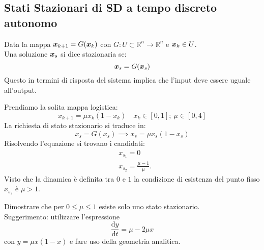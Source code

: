 \subsection{Stati Stazionari di SD a tempo discreto autonomo}%
\label{sub:Stati Stazionari di SD a tempo discreto autonomo}
\begin{defn}
    Data la mappa $\boldsymbol{x}_{k+1}= G(\boldsymbol{x}_k)$ con $G: U \subset \mathbb{R}^n \to \mathbb{R}^n$ e $\boldsymbol{x}_k \in U$.\\
    Una soluzione $\boldsymbol{x}_{s}$ si dice stazionaria se:
    \[
	\boldsymbol{x}_s = G(\boldsymbol{x}_s)
    \] 
    Questo in termini di risposta del sistema implica che l'input deve essere uguale all'output.
\end{defn}
\noindent
\begin{exmp}
    Prendiamo la solita mappa logistica:
    \[
	x_{k+1}= \mu x_k(1-x_k) \quad x_k \in \left[0,1\right]; \ \mu  \in \left[0, 4\right]
    \] 
    La richiesta di stato stazionario si traduce in:
    \[
	x_s = G(x_s) \implies  x_s = \mu x_s(1-x_s)
    \] 
    Risolvendo l'equazione si trovano i candidati:
    \[\begin{aligned}
	&x_{s_1}= 0\\
	& x_{s_2}=\frac{\mu-1}{\mu}
    .\end{aligned}\]
    Visto che la dinamica è definita tra $0$ e $1$ la condizione di esistenza del punto fisso $x_{s_2}$ è $\mu >1$.
\end{exmp}
\noindent
\begin{ex}
    Dimostrare che per $0\le \mu\le 1$ esiste solo uno stato stazionario.\\
     Suggerimento: utilizzare l'espressione 
    \[
        \frac{\text{d} y}{\text{d} t} = \mu-2\mu x
    \] con $y = \mu x(1-x)$ e fare uso della geometria analitica.
\end{ex}
\noindent
